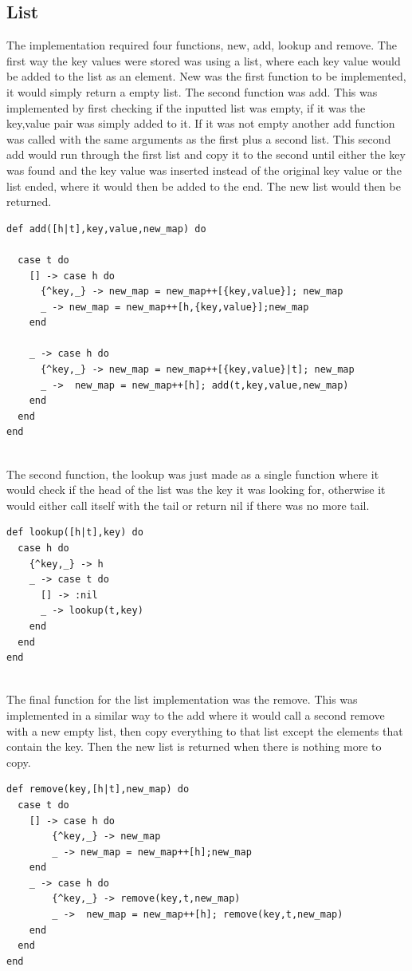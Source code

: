 \documentclass[a4paper,11pt]{article}
\begin{document}
\subsection*{List}
The implementation required four functions, new, add, lookup and remove. The first way the key values were stored was using a list, where each key value would be added to the list as an element. New was the first function to be implemented, it would simply return a empty list. 
The second function was add. This was implemented by first checking if the inputted list was empty, if it was the key,value pair was simply added to it. If it was not empty another add function was called with the same arguments as the first plus a second list. This second add would run through the first list and copy it to the second until either the key was found and the key value was inserted instead of the original key value or the list ended, where it would then be added to the end. 
The new list would then be returned.
\begin{verbatim}
def add([h|t],key,value,new_map) do

  case t do
    [] -> case h do
      {^key,_} -> new_map = new_map++[{key,value}]; new_map
      _ -> new_map = new_map++[h,{key,value}];new_map
    end

    _ -> case h do
      {^key,_} -> new_map = new_map++[{key,value}|t]; new_map
      _ ->  new_map = new_map++[h]; add(t,key,value,new_map)
    end
  end
end
    
\end{verbatim}
The second function, the lookup was just made as a single function where it would check if the head of the list was the key it was looking for, otherwise it would either call itself with the tail or return nil if there was no more tail.
\begin{verbatim}
def lookup([h|t],key) do
  case h do
    {^key,_} -> h
    _ -> case t do
      [] -> :nil
      _ -> lookup(t,key)
    end
  end
end
    
\end{verbatim}
The final function for the list implementation was the remove. This was implemented in a similar way to the add where it would call a second remove with a new empty list, then copy everything to that list except the elements that contain the key. Then the new list is returned when there is nothing more to copy.
\begin{verbatim}
def remove(key,[h|t],new_map) do
  case t do
    [] -> case h do
        {^key,_} -> new_map
        _ -> new_map = new_map++[h];new_map
    end
    _ -> case h do
        {^key,_} -> remove(key,t,new_map)
        _ ->  new_map = new_map++[h]; remove(key,t,new_map)
    end
  end
end
\end{verbatim}
\end{document}
